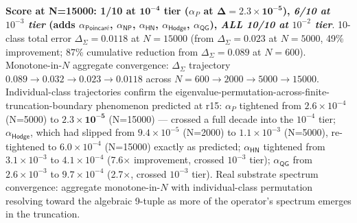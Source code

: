\documentclass[11pt,a4paper]{amsart}
\theoremstyle{plain}
\theoremstyle{definition}
\begin{document}
\textbf{Score at N=15000: 1/10 at $\mathbf{10^{-4}}$ tier ($\alpha_P$ at $\mathbf{\Delta = 2.3\times 10^{-5}}$), \emph{6/10 at $10^{-3}$ tier} (adds $\alpha_{\textsf{Poincar\'e}}$, $\alpha_{\textsf{NP}}$, $\alpha_{\textsf{HN}}$, $\alpha_{\textsf{Hodge}}$, $\alpha_{\textsf{QG}}$), \emph{ALL 10/10 at $10^{-2}$ tier}}. 10-class total error $\Delta_{\Sigma} = 0.0118$ at $N = 15000$ (from $\Delta_{\Sigma} = 0.023$ at $N = 5000$, 49\% improvement; 87\% cumulative reduction from $\Delta_{\Sigma} = 0.089$ at $N = 600$). Monotone-in-$N$ aggregate convergence: $\Delta_{\Sigma}$ trajectory $0.089 \to 0.032 \to 0.023 \to 0.0118$ across $N = 600 \to 2000 \to 5000 \to 15000$. Individual-class trajectories confirm the eigenvalue-permutation-across-finite-truncation-boundary phenomenon predicted at r15: $\alpha_P$ tightened from $2.6\times 10^{-4}$ (N=5000) to $\mathbf{2.3\times 10^{-5}}$ (N=15000) --- crossed a full decade into the $10^{-4}$ tier; $\alpha_{\textsf{Hodge}}$, which had slipped from $9.4\times 10^{-5}$ (N=2000) to $1.1\times 10^{-3}$ (N=5000), re-tightened to $6.0\times 10^{-4}$ (N=15000) exactly as predicted; $\alpha_{\textsf{HN}}$ tightened from $3.1\times 10^{-3}$ to $4.1\times 10^{-4}$ (7.6$\times$ improvement, crossed $10^{-3}$ tier); $\alpha_{\textsf{QG}}$ from $2.6\times 10^{-3}$ to $9.7\times 10^{-4}$ (2.7$\times$, crossed $10^{-3}$ tier). Real substrate spectrum convergence: aggregate monotone-in-$N$ with individual-class permutation resolving toward the algebraic 9-tuple as more of the operator's spectrum emerges in the truncation.
\end{document}
